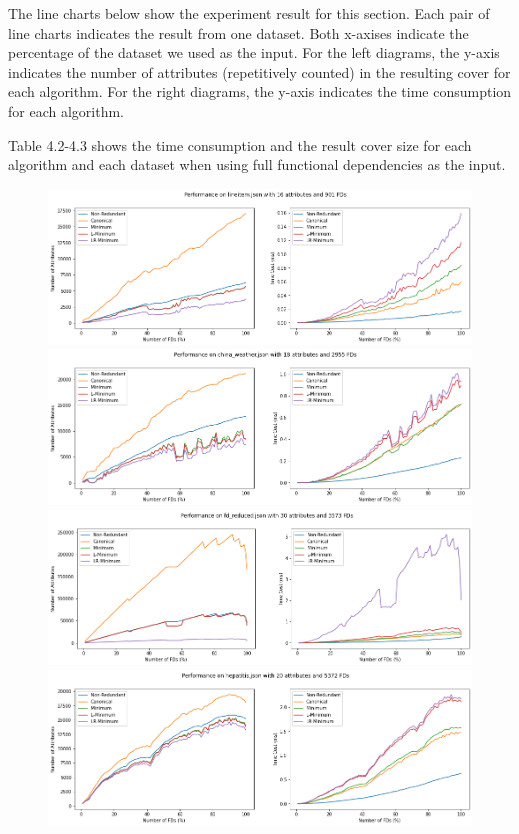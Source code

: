 \documentclass[11pt]{book}
\begin{document}
The line charts below show the experiment result for this section. Each pair of line charts indicates the result from one dataset. Both x-axises indicate the percentage of the dataset we used as the input. For the left diagrams, the y-axis indicates the number of attributes (repetitively counted) in the resulting cover for each algorithm. For the right diagrams, the y-axis indicates the time consumption for each algorithm.

Table 4.2-4.3 shows the time consumption and the result cover size for each algorithm and each dataset when using full functional dependencies as the input.

\begin{figure}
	\centering
	\includegraphics[width=\textwidth]{./diagrams/lab1/lineitem.png}
	\includegraphics[width=\textwidth]{./diagrams/lab1/china_weather.png}
	\includegraphics[width=\textwidth]{./diagrams/lab1/fd_reduced.png}
	\includegraphics[width=\textwidth]{./diagrams/lab1/hepatitis.png}
\end{figure}
\end{document}
